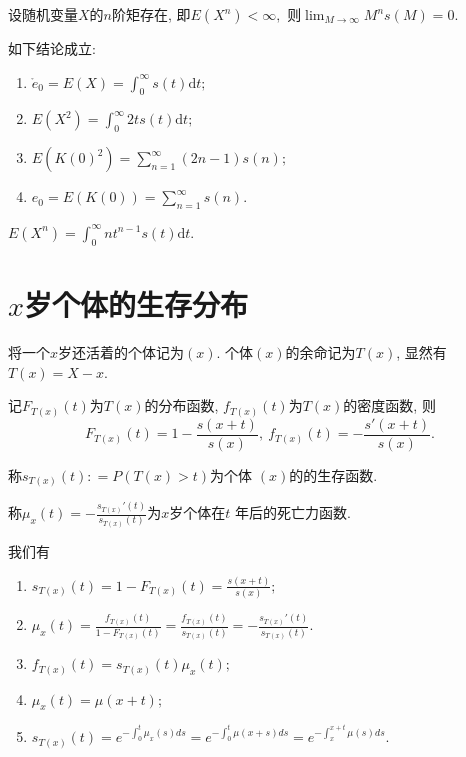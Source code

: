 \documentclass[lang=cn,10pt]{elegantbook}
\begin{document}
\begin{lemma}\label{lemm0}
    设随机变量$X$的$n$阶矩存在, 即$E(X^n) < \infty,$ 则$\lim_{M \rightarrow \infty}M^ns(M) = 0.$
\end{lemma}

\begin{corollary}如下结论成立:
    \begin{enumerate}
         \item $\mathring{e}_0 = E(X) = \int_0^{\infty}s(t)\mathrm{d}t;$
        \item $E(X^2) = \int_{0}^{\infty} 2ts(t)\mathrm{d}t;$
        \item $E(K(0)^2) = \sum_{n = 1}^{\infty} (2n-1)s(n);$
        \item $e_0=E(K(0)) = \sum_{n = 1}^{\infty} s(n).$
    \end{enumerate}
\end{corollary}

\begin{remark}
	$E(X^n)=\int_0^\infty nt^{n-1}s(t)\mathrm{d}t$.
\end{remark}

\section{$x$岁个体的生存分布}

\begin{definition}
	将一个$x$岁还活着的个体记为$(x).$ 个体$(x)$的余命记为$T(x)$, 显然有$T(x)=X-x$.

	记$F_{T(x)}(t)$为$T(x)$的分布函数, $f_{T(x)}(t)$为$T(x)$的密度函数, 则$$F_{T(x)}(t) = 1 - \frac{s(x+t)}{s(x)}, ~f_{T(x)}(t) = -\frac{s'(x+t)}{s(x)}.$$

	称$s_{T(x)}(t): = P(T(x)>t)$为个体 $(x)$的的生存函数.
\end{definition}

\begin{definition}[$x$岁个体的死亡力]
    称$\mu_x(t) = -\frac{s_{T(x)}'(t)}{s_{T(x)}(t)}$为$x$岁个体在$t$ 年后的死亡力函数.
\end{definition}

\begin{corollary}
	我们有
	\begin{enumerate}
		\item $s_{T(x)}(t)=1-F_{T(x)}(t)=\frac{s(x+t)}{s(x)};$
		\item $\mu_{x}(t)=\frac{f_{T(x)}(t)}{1-F_{T(x)}(t)}=\frac{f_{T(x)}(t)}{s_{T(x)}(t)}=-\frac{s_{T(x)}'(t)}{s_{T(x)}(t)}.$
		\item $f_{T(x)}(t)=s_{T(x)}(t)\mu_{x}(t);$
		\item $\mu_x(t)=\mu(x+t);$
		\item $s_{T(x)}(t)=e^{-\int_0^t \mu_x(s)ds}=e^{-\int_0^t \mu(x+s)ds}=e^{-\int_x^{x+t} \mu(s)ds}.$
	\end{enumerate}
\end{corollary}
\end{document}
